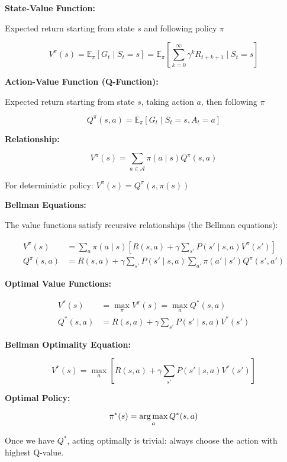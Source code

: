 \begin{seanbox}{5.2}
\textbf{State-Value Function:}

Expected return starting from state $s$ and following policy $\pi$

\begin{equation}
    V^\pi(s) = \mathbb{E}_\pi\left[ G_t \mid S_t = s \right] = \mathbb{E}_\pi\left[ \sum_{k=0}^{\infty} \gamma^k R_{t+k+1} \mid S_t = s \right]
\end{equation}

\textbf{Action-Value Function (Q-Function):}

Expected return starting from state $s$, taking action $a$, then following $\pi$

\begin{equation}
    Q^\pi(s, a) = \mathbb{E}_\pi\left[ G_t \mid S_t = s, A_t = a \right]
\end{equation}

\textbf{Relationship:}

\begin{equation}
    V^\pi(s) = \sum_{a \in \mathcal{A}} \pi(a \mid s) Q^\pi(s, a)
\end{equation}

For deterministic policy: $V^\pi(s) = Q^\pi(s, \pi(s))$

\textbf{Bellman Equations:}

The value functions satisfy recursive relationships (the Bellman equations):

\begin{align}
    V^\pi(s) &= \sum_{a} \pi(a \mid s) \left[ R(s, a) + \gamma \sum_{s'} P(s' \mid s, a) V^\pi(s') \right] \\
    Q^\pi(s, a) &= R(s, a) + \gamma \sum_{s'} P(s' \mid s, a) \sum_{a'} \pi(a' \mid s') Q^\pi(s', a')
\end{align}

\textbf{Optimal Value Functions:}

\begin{align}
    V^*(s) &= \max_\pi V^\pi(s) = \max_a Q^*(s, a) \\
    Q^*(s, a) &= R(s, a) + \gamma \sum_{s'} P(s' \mid s, a) V^*(s')
\end{align}

\textbf{Bellman Optimality Equation:}

\begin{equation}
    V^*(s) = \max_a \left[ R(s, a) + \gamma \sum_{s'} P(s' \mid s, a) V^*(s') \right]
\end{equation}

\textbf{Optimal Policy:}

\begin{equation}
    \pi^*(s) = \operatorname*{arg\,max}_a Q^*(s, a)
\end{equation}

Once we have $Q^*$, acting optimally is trivial: always choose the action with highest Q-value.
\end{seanbox}


